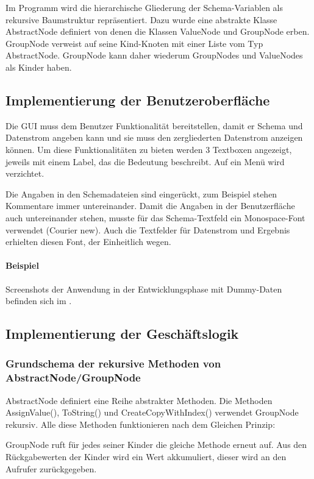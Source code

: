 {Im Programm wird die hierarchische Gliederung der Schema-Variablen als rekursive Baumstruktur repräsentiert. Dazu wurde eine abstrakte Klasse AbstractNode definiert von denen die Klassen ValueNode und GroupNode erben. GroupNode verweist auf seine Kind-Knoten mit einer Liste vom Typ AbstractNode. GroupNode kann daher wiederum GroupNodes und ValueNodes als Kinder haben.

\subsection{Implementierung der Benutzeroberfläche}
\label{sec:ImplementierungBenutzeroberflaeche}
Die \ac{GUI} muss dem Benutzer Funktionalität bereitstellen, damit er Schema und Datenstrom angeben kann und sie muss den zergliederten Datenstrom anzeigen können.
Um diese Funktionalitäten zu bieten werden 3 Textboxen angezeigt, jeweils mit einem Label, das die Bedeutung beschreibt. Auf ein Menü wird verzichtet.

Die Angaben in den Schemadateien sind eingerückt, zum Beispiel stehen Kommentare immer untereinander. Damit die Angaben in der Benutzerfläche auch untereinander stehen, musste für das Schema-Textfeld ein Monospace-Font verwendet (Courier new). Auch die Textfelder für Datenstrom und Ergebnis erhielten diesen Font, der Einheitlich wegen.
\paragraph{Beispiel}
Screenshots der Anwendung in der Entwicklungsphase mit Dummy-Daten befinden sich im .


\subsection{Implementierung der Geschäftslogik}
\label{sec:ImplementierungGeschaeftslogik}

\subsubsection{Grundschema der rekursive Methoden von AbstractNode/GroupNode}

AbstractNode definiert eine Reihe abstrakter Methoden. Die Methoden AssignValue(), ToString() und CreateCopyWithIndex() verwendet GroupNode rekursiv. Alle diese Methoden funktionieren nach dem Gleichen Prinzip: 

GroupNode ruft für jedes seiner Kinder die gleiche Methode erneut auf. Aus den Rückgabewerten der Kinder wird ein Wert akkumuliert, dieser wird an den Aufrufer zurückgegeben.

}
